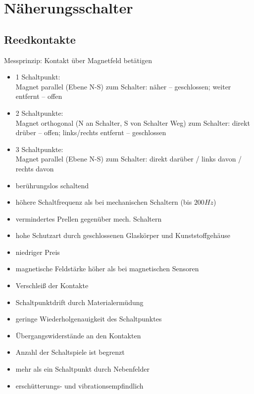 \section{Näherungsschalter}
\subsection{Reedkontakte}
Messprinzip: Kontakt über Magnetfeld betätigen
\begin{itemize}
\item 1 Schaltpunkt:\\
Magnet parallel (Ebene N-S) zum Schalter: näher -- geschlossen; weiter entfernt -- offen
\item 2 Schaltpunkte:\\
Magnet orthogonal (N an Schalter, S von Schalter Weg) zum Schalter: direkt drüber -- offen; links/rechts entfernt -- geschlossen
\item 3 Schaltpunkte:\\
Magnet parallel (Ebene N-S) zum Schalter: direkt darüber / links davon / rechts davon
\end{itemize}
\begin{itemize}[label=$+$]
\item berührungslos schaltend
\item höhere Schaltfrequenz als bei mechanischen Schaltern (bis $200\unit{Hz}$)
\item vermindertes Prellen gegenüber mech. Schaltern
\item hohe Schutzart durch geschlossenen Glaskörper und Kunststoffgehäuse
\item niedriger Preis
\end{itemize}
\begin{itemize}[label=$-$]
\item magnetische Feldstärke höher als bei magnetischen Sensoren
\item Verschleiß der Kontakte
\item Schaltpunktdrift durch Materialermüdung
\item geringe Wiederholgenauigkeit des Schaltpunktes
\item Übergangswiderstände an den Kontakten
\item Anzahl der Schaltspiele ist begrenzt
\item mehr als ein Schaltpunkt durch Nebenfelder
\item erschütterungs- und vibrationsempfindlich
\end{itemize}

